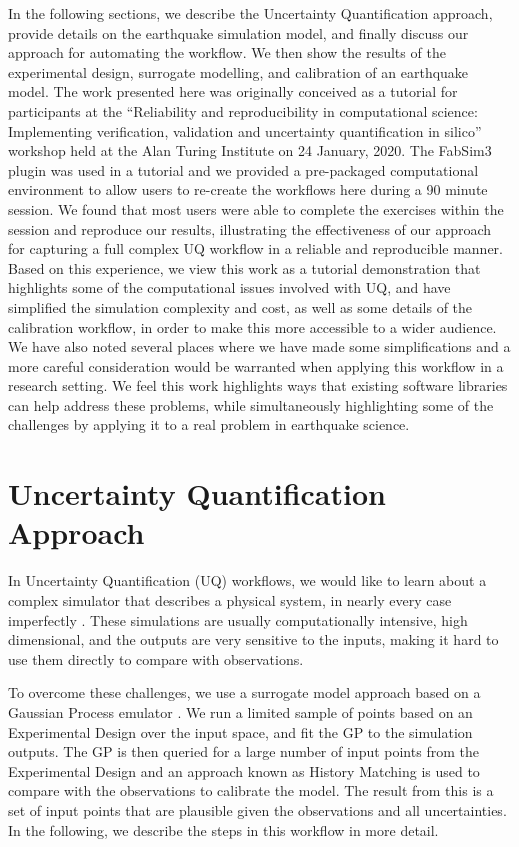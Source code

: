 \documentclass[openacc]{rstransa}%
\begin{document}
In the following sections, we describe the Uncertainty Quantification approach, provide details
on the earthquake simulation model, and finally discuss our approach for automating the workflow.
We then show the results of the experimental design, surrogate modelling, and calibration
of an earthquake model. The work presented here was originally conceived as a tutorial for participants at the
``Reliability and reproducibility in computational science: Implementing verification, validation and uncertainty quantification in silico'' workshop held at the Alan Turing Institute on 24 January, 2020.
The FabSim3 plugin was used in a tutorial and we provided a pre-packaged computational environment
to allow users to re-create the workflows here during a 90 minute session. We found that most
users were able to complete the exercises within the session and reproduce our results,
illustrating the effectiveness of our approach for capturing a full complex UQ workflow
in a reliable and reproducible manner. Based on this experience,
we view this work as a tutorial demonstration that highlights
some of the computational issues involved with UQ, and have simplified the
simulation complexity and cost, as well as some details of the calibration
workflow, in order to make this more accessible to a wider audience.
We have also noted several places where we have made some simplifications
and a more careful consideration would be
warranted when applying this workflow in a research setting.
We feel this work highlights ways that existing
software libraries can help address these problems, while simultaneously
highlighting some of the challenges by applying it to a real problem
in earthquake science.

\section{Uncertainty Quantification Approach}

In Uncertainty Quantification (UQ) workflows, we would like to learn about a complex simulator that describes
a physical system, in nearly every case imperfectly \cite{experimentaldesign,calibration}.
These simulations are usually computationally intensive,
high dimensional, and the outputs are very sensitive to the inputs, making it hard to use them directly
to compare with observations.

To overcome these challenges, we use a surrogate model approach based on a Gaussian Process emulator \cite{gprw}.
We run a limited sample of points based on an Experimental Design over the input space, and fit the GP
to the simulation outputs. The GP is then queried for a large number of input points from the Experimental
Design and an approach known as History Matching is used to compare with the observations
to calibrate the model. The result from this is a set of input points that are plausible given the
observations and all uncertainties. In the following, we describe the steps in this workflow in more detail.
\end{document}
